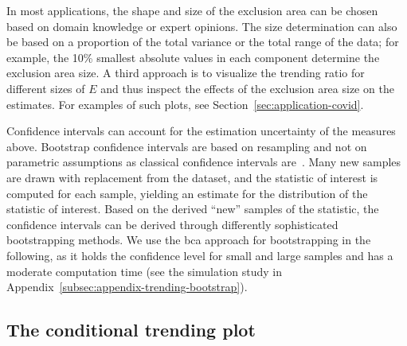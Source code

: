 \documentclass[pdflatex]{sn-jnl}
\theoremstyle{plain}%
\theoremstyle{definition}
\begin{document}
In most applications, the shape and size of the exclusion area can be chosen based on domain knowledge or expert opinions.
The size determination can also be based on a proportion of the total variance or the total range of the data; for example, the 10\% smallest absolute values in each component determine the exclusion area size.
A third approach is to visualize the trending ratio for different sizes of $E$ and thus inspect the effects of the exclusion area size on the estimates.
For examples of such plots, see Section~\ref{sec:application-covid}.

Confidence intervals can account for the estimation uncertainty of the measures above.
Bootstrap confidence intervals are based on resampling and not on parametric assumptions as classical confidence intervals are~\parencite[for introductions see][]{Hesterberg2011,Bittmann2021}.
Many new samples are drawn with replacement from the dataset, and the statistic of interest is computed for each sample, yielding an estimate for the distribution of the statistic of interest.
Based on the derived \enquote{new} samples of the statistic, the confidence intervals can be derived through differently sophisticated bootstrapping methods.
We use the \ac{bca} approach for bootstrapping in the following, as it holds the confidence level for small and large samples and has a moderate computation time (see the simulation study in Appendix~\ref{subsec:appendix-trending-bootstrap}).


\subsection{The conditional trending plot}\label{subsec:aatc-cond-prob}
\end{document}
